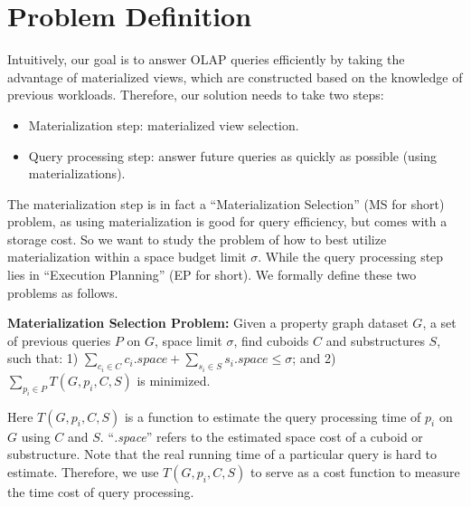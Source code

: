 \section{Problem Definition}
\label{sec:Problem Definition}

Intuitively, our goal is to answer OLAP queries efficiently by taking the advantage of materialized views, which are constructed based on the knowledge of previous workloads. Therefore, our solution needs to take two steps:

\begin{itemize}
	\item Materialization step: materialized view selection. 
	\item Query processing step: answer future queries as quickly as possible (using materializations). 
\end{itemize} 

The materialization step is in fact a ``Materialization Selection'' (MS for short) problem, as using materialization is good for query efficiency, but comes with a storage cost. So we want to study the problem of how to best utilize materialization within a space budget limit $\sigma$.   While the query processing step lies in ``Execution Planning'' (EP for short). We formally define these two problems as follows.

\noindent\textbf{Materialization Selection Problem:} Given a property graph dataset $G$, a set of previous queries $P$ on $G$, space limit $\sigma$, find cuboids $C$ and substructures $S$, such that: 1) $\displaystyle{\sum_{c_{i}\in C}c_{i}.space} + 
\displaystyle{\sum_{s_{i}\in S}s_{i}.space} 
\leq \sigma
$; and 2) $\displaystyle{\sum_{p_{i}\in P}T(G, p_{i}, C, S)}$  is minimized. 

Here $T(G, p_{i}, C, S)$ is a function to estimate the  query processing time of $p_{i}$ on $G$ using  $C$ and $S$. ``\emph{.space}'' refers to the estimated space cost of a cuboid or substructure. Note that the real running time of a particular query is hard to estimate. Therefore, we use $T(G, p_{i}, C, S)$ to serve as a cost function to measure the time cost of query processing. 


